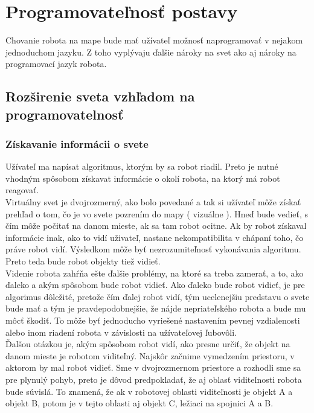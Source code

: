 \section{Programovateľnosť postavy}
Chovanie robota na mape bude mať užívateľ možnosť naprogramovať v nejakom jednoduchom jazyku. Z toho vyplývaju ďalšie nároky na svet ako aj nároky na programovací jazyk robota. 
\subsection{Rozširenie sveta vzhľadom na programovatelnosť}
\subsubsection{Získavanie informácii o svete}
Užívateľ ma napísat algoritmus, ktorým by sa robot riadil. Preto je nutné vhodným spôsobom získavat informácie o okolí robota, na ktorý má robot reagovať. \\
\indent Virtuálny svet je dvojrozmerný, ako bolo povedané a tak si užívateľ môže získať prehľad o tom, čo je vo svete pozrením do mapy ( vizuálne ). Hneď bude vedieť, s čím môže počitať na danom mieste, ak sa tam robot ocitne. Ak by robot získaval informácie inak, ako to vidí uživateľ, nastane nekompatibilita v chápaní toho, čo práve robot vidí. Výsledkom môže byť nezrozumiteľnosť vykonávania algoritmu. %
Preto teda bude robot objekty tiež vidieť.\\
Videnie robota zahŕňa ešte ďalšie problémy, na ktoré sa treba zamerať, a to, ako ďaleko a akým spôsobom bude robot vidieť. Ako ďaleko bude robot vidieť, je pre algorimus dôležité, pretože čím ďalej robot vidí, tým ucelenejšiu predstavu o svete bude mať a tým je pravdepodobnejšie, že nájde nepriateľského robota a bude mu môcť škodiť. To môže byť jednoducho vyriešené nastavením pevnej vzdialenosti alebo inom riadení robota v závislosti na užívateľovej ľubovôli. \\ %
Ďalšou otázkou je, akým spôsobom robot vidí, ako presne určiť, že objekt na danom mieste je robotom viditeľný. Najskôr začnime vymedzením priestoru, v aktorom by mal robot vidieť. Sme v dvojrozmernom priestore a rozhodli sme sa pre plynulý pohyb, preto je dôvod predpokladať, že aj oblasť viditeľnosti robota bude súvislá. To znamená, že ak v robotovej oblasti viditeľnosti je objekt A a objekt B, potom je v tejto oblasti aj objekt C, ležiaci na spojnici A a B.
